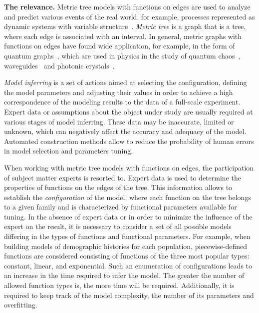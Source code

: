 \textbf{The relevance.} %
Metric tree models with functions on edges are used to analyze and predict various events of the real world, for example, processes represented as dynamic systems with variable structure~\cite{кириллов2009динамические, aldous1993continuum}.
\textit{Metric tree} is a graph that is a tree, where each edge is associated with an interval.
In general, metric graphs with functions on edges have found wide application, for example, in the form of quantum graphs~\cite{berkolaiko2013introduction}, which are used in physics in the study of quantum chaos~\cite{kottos1997quantum}, waveguides~\cite{exner2015quantum} and photonic crystals~\cite{kuchment2002differential}.

\textit{Model inferring} is a set of actions aimed at selecting the configuration, defining the model parameters and adjusting their values in order to achieve a high correspondence of the modeling results to the data of a full-scale experiment.
Expert data or assumptions about the object under study are usually required at various stages of model inferring.
These data may be inaccurate, limited or unknown, which can negatively affect the accuracy and adequacy of the model.
Automated construction methods allow to reduce the probability of human errors in model selection and parameters tuning.

When working with metric tree models with functions on edges, the participation of subject matter experts is resorted to.
Expert data is used to determine the properties of functions on the edges of the tree.
This information allows to establish the \textit{configuration} of the model, where each function on the tree belongs to a given family and is characterized by functional parameters available for tuning.
In the absence of expert data or in order to minimize the influence of the expert on the result, it is necessary to consider a set of all possible models differing in the types of functions and functional parameters.
For example, when building models of demographic histories for each population, piecewise-defined functions are considered consisting of functions of the three most popular types: constant, linear, and exponential.
Such an enumeration of configurations leads to an increase in the time required to infer the model.
The greater the number of allowed function types is, the more time will be required.
Additionally, it is required to keep track of the model complexity, the number of its parameters and overfitting.

